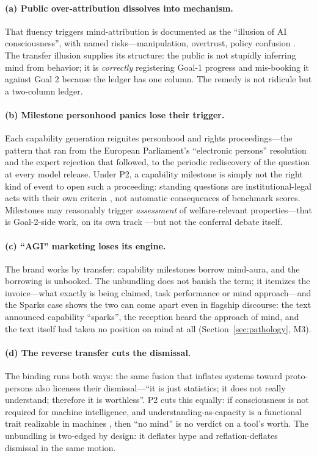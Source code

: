 \documentclass[10pt]{article}
\begin{document}
\paragraph{(a) Public over-attribution dissolves into mechanism.} That fluency triggers mind-attribution is documented as the ``illusion of AI consciousness'', with named risks---manipulation, overtrust, policy confusion \cite{elmoznino2025illusions}. The transfer illusion supplies its structure: the public is not stupidly inferring mind from behavior; it is \emph{correctly} registering Goal-1 progress and mis-booking it against Goal 2 because the ledger has one column. The remedy is not ridicule but a two-column ledger.

\paragraph{(b) Milestone personhood panics lose their trigger.} Each capability generation reignites personhood and rights proceedings---the pattern that ran from the European Parliament's ``electronic persons'' resolution \cite{eu2017resolution} and the expert rejection that followed, to the periodic rediscovery of the question at every model release. Under P2, a capability milestone is simply not the right kind of event to open such a proceeding: standing questions are institutional-legal acts with their own criteria \cite{bostrom2014ethics,gunkel2018rights}, not automatic consequences of benchmark scores. Milestones may reasonably trigger \emph{assessment} of welfare-relevant properties---that is Goal-2-side work, on its own track \cite{long2024welfare,anthropic2025welfare}---but not the conferral debate itself.

\paragraph{(c) ``AGI'' marketing loses its engine.} The brand works by transfer: capability milestones borrow mind-aura, and the borrowing is unbooked. The unbundling does not banish the term; it itemizes the invoice---what exactly is being claimed, task performance or mind approach---and the Sparks case shows the two can come apart even in flagship discourse: the text announced capability ``sparks'', the reception heard the approach of mind, and the text itself had taken no position on mind at all (Section~\ref{sec:pathology}, M3).

\paragraph{(d) The reverse transfer cuts the dismissal.} The binding runs both ways: the same fusion that inflates systems toward proto-persons also licenses their dismissal---``it is just statistics; it does not really understand; therefore it is worthless''. P2 cuts this equally: if consciousness is not required for machine intelligence, and understanding-as-capacity is a functional trait realizable in machines \cite{pesonen2026notobstacles}, then ``no mind'' is no verdict on a tool's worth. The unbundling is two-edged by design: it deflates hype and reflation-deflates dismissal in the same motion.
\end{document}
